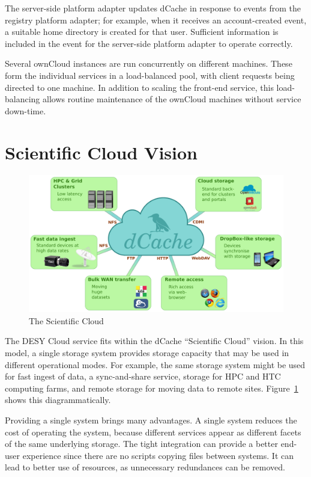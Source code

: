 \documentclass[a4paper]{jpconf}
\begin{document}
The server-side platform adapter updates dCache in response to events
from the registry platform adapter; for example, when it receives an
account-created event, a suitable home directory is created for that
user.  Sufficient information is included in the event for the
server-side platform adapter to operate correctly.

Several ownCloud instances are run concurrently on different machines.
These form the individual services in a load-balanced pool, with
client requests being directed to one machine.  In addition to scaling
the front-end service, this load-balancing allows routine maintenance
of the ownCloud machines without service down-time.

\section{Scientific Cloud Vision}

\begin{figure}
  \centering
  \includegraphics[width=\textwidth]{Figures/dCache-cloud}
  \caption{The Scientific Cloud}
  \label{fig:scicloud}
\end{figure}

The DESY Cloud service fits within the dCache ``Scientific Cloud''
vision.  In this model, a single storage system provides storage
capacity that may be used in different operational modes.  For
example, the same storage system might be used for fast ingest of
data, a sync-and-share service, storage for HPC and HTC computing
farms, and remote storage for moving data to remote sites.
Figure~\ref{fig:scicloud} shows this diagrammatically.

Providing a single system brings many advantages.  A single system
reduces the cost of operating the system, because different services
appear as different facets of the same underlying storage.  The tight
integration can provide a better end-user experience since there are
no scripts copying files between systems.  It can lead to better use
of resources, as unnecessary redundances can be removed.
\end{document}
